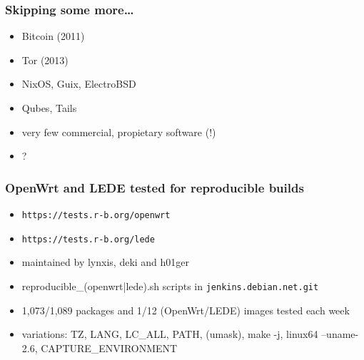 \documentclass[14pt,aspectratio=169]{beamer}
\begin{document}
\begin{frame}
 \frametitle{Skipping some more…}
 \begin{itemize}
\item Bitcoin (2011)
\item Tor (2013)
\item NixOS, Guix, ElectroBSD
\item Qubes, Tails
\item very few commercial, propietary software (!)
\item ?
 \end{itemize}
\end{frame}


\begin{frame}
 \frametitle{OpenWrt and LEDE tested for reproducible builds}
 \begin{itemize}
  \item \texttt{https://tests.r-b.org/openwrt}
  \item \texttt{https://tests.r-b.org/lede}
  \item maintained by lynxis, deki and h01ger
  \item reproducible\_(openwrt|lede).sh scripts in \texttt{jenkins.debian.net.git}
  \item 1,073/1,089 packages and 1/12 (OpenWrt/LEDE) images tested each week
  \item variations: TZ, LANG, LC\_ALL, PATH, (umask), make -j, linux64 --uname-2.6, CAPTURE\_ENVIRONMENT
 \end{itemize}

\end{frame}
\end{document}
